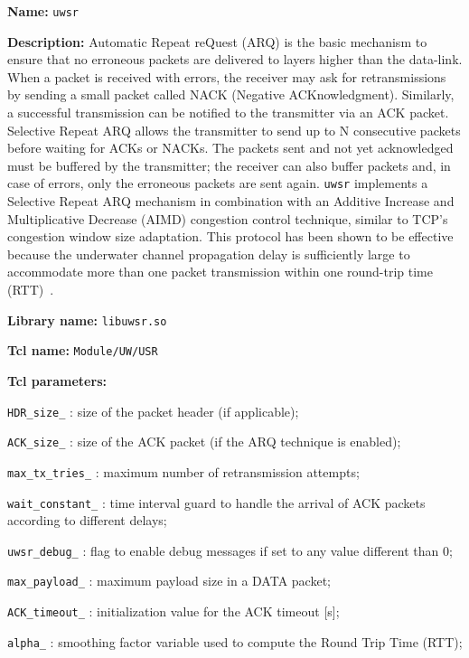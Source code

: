 \begin{description}
   \item {\bf Name:} {\tt uwsr}
   \item {\bf Description:} Automatic Repeat reQuest (ARQ) is the basic mechanism to ensure that no erroneous packets are delivered to layers higher than the data-link. When a packet is received with errors, the receiver may ask for retransmissions by sending a small packet called NACK (Negative ACKnowledgment). Similarly, a successful transmission can be notified to the transmitter via an ACK packet. Selective Repeat ARQ allows the transmitter to send up to N consecutive packets before waiting for ACKs or NACKs. The packets sent and not yet acknowledged must be buffered by the transmitter; the receiver can also buffer packets and, in case of errors, only the erroneous packets are sent again. {\tt uwsr} implements a Selective Repeat ARQ mechanism in combination with an Additive Increase and Multiplicative Decrease (AIMD) congestion control technique, similar to TCP's congestion window size adaptation. This protocol has been shown to be effective because the underwater channel propagation delay is sufficiently large to accommodate more than one packet transmission within one round-trip time (RTT)~\cite{AzadSantander}. 
   \item {\bf Library name:} {\tt libuwsr.so}
   \item {\bf Tcl name:} {\tt Module/UW/USR}
   \item {\bf Tcl parameters:} 
    \begin{description}
     \item {\tt HDR\_size\_} : size of the packet header (if applicable);
     \item {\tt ACK\_size\_} : size of the ACK packet (if the ARQ technique is enabled);
     \item {\tt max\_tx\_tries\_} : maximum number of retransmission attempts;
     \item {\tt wait\_constant\_} : time interval guard to handle the arrival of ACK packets according to different delays;
     \item {\tt uwsr\_debug\_} : flag to enable debug messages if set to any value different than $0$;
     \item {\tt max\_payload\_} : maximum payload size in a DATA packet;
     \item {\tt ACK\_timeout\_} : initialization value for the ACK timeout [s];
     \item {\tt alpha\_} : smoothing factor variable used to compute the Round Trip Time (RTT);

\end{description}
\end{description}
